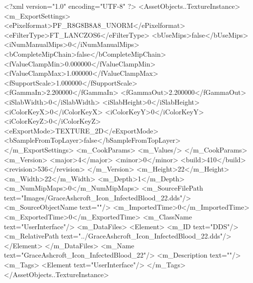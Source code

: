 <?xml version="1.0" encoding="UTF-8" ?>
<AssetObjects..TextureInstance>
	<m_ExportSettings>
		<ePixelformat>PF_R8G8B8A8_UNORM</ePixelformat>
		<eFilterType>FT_LANCZOS6</eFilterType>
		<bUseMips>false</bUseMips>
		<iNumManualMips>0</iNumManualMips>
		<bCompleteMipChain>false</bCompleteMipChain>
		<fValueClampMin>0.000000</fValueClampMin>
		<fValueClampMax>1.000000</fValueClampMax>
		<fSupportScale>1.000000</fSupportScale>
		<fGammaIn>2.200000</fGammaIn>
		<fGammaOut>2.200000</fGammaOut>
		<iSlabWidth>0</iSlabWidth>
		<iSlabHeight>0</iSlabHeight>
		<iColorKeyX>0</iColorKeyX>
		<iColorKeyY>0</iColorKeyY>
		<iColorKeyZ>0</iColorKeyZ>
		<eExportMode>TEXTURE_2D</eExportMode>
		<bSampleFromTopLayer>false</bSampleFromTopLayer>
	</m_ExportSettings>
	<m_CookParams>
		<m_Values/>
	</m_CookParams>
	<m_Version>
		<major>4</major>
		<minor>0</minor>
		<build>410</build>
		<revision>536</revision>
	</m_Version>
	<m_Height>22</m_Height>
	<m_Width>22</m_Width>
	<m_Depth>1</m_Depth>
	<m_NumMipMaps>0</m_NumMipMaps>
	<m_SourceFilePath text="Images/GraceAshcroft_Icon_InfectedBlood_22.dds"/>
	<m_SourceObjectName text=""/>
	<m_ImportedTime>0</m_ImportedTime>
	<m_ExportedTime>0</m_ExportedTime>
	<m_ClassName text="UserInterface"/>
	<m_DataFiles>
		<Element>
			<m_ID text="DDS"/>
			<m_RelativePath text="../GraceAshcroft_Icon_InfectedBlood_22.dds"/>
		</Element>
	</m_DataFiles>
	<m_Name text="GraceAshcroft_Icon_InfectedBlood_22"/>
	<m_Description text=""/>
	<m_Tags>
		<Element text="UserInterface"/>
	</m_Tags>
</AssetObjects..TextureInstance>
